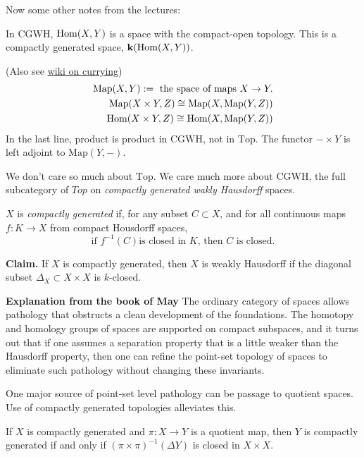 Now some other notes from the lectures:

In $\text{CGWH}$, $\mathop{\mathrm{Hom}}\nolimits(X,Y)$ is a space with
the compact-open topology.
This is a compactly generated space,
$\mathbf{k}(\mathop{\mathrm{Hom}}\nolimits(X,Y))$.

(Also see
\href{https://en.wikipedia.org/wiki/%
Currying#Function_spaces}{wiki
on currying})
$$
\begin{aligned}
\text{Map}(X,Y):=\text{ the space of maps
}X\to Y.\\
\text{Map}(X\times
Y,Z)\cong\text{Map}(X,\text{Map}(Y,Z))\\
\mathop{\mathrm{Hom}}\nolimits(X\times Y,Z)\cong
\mathop{\mathrm{Hom}}\nolimits(X,\text{Map}(Y,Z))
\end{aligned}
$$
In the last line, product is product in
$\text{CGWH}$, not in $\text{Top}$.
The functor $-\times Y$ is left adjoint to
$\text{Map}(Y,-)$.

We don't care so much about $\text{Top}$. We
care much more about $\text{CGWH}$,
the full subcategory of $\mathit{Top}$ on
 {\it compactly generated wakly Hausdorff}
 spaces.

\begin{definition}
\label{definition-is-this-right}
$X$ is {\it compactly generated} if, for any
subset $C\subset X$, and for all continuous
maps $f:K\to X$ from compact Housdorff
spaces, $$\text{if } f^{-1}(C) \text{is
closed in }K\text{, then } C\text{ is
closed}.$$
\end{definition}
{\bf Claim.}
If $X$ is compactly generated, then $X$ is
weakly Hausdorff if the diagonal subset
$\Delta_X\subset X\times X$ is $k$-closed.


{\bf Explanation from the book of May}
The ordinary category of spaces
allows pathology that obstructs a clean
development of the foundations.
The homotopy and homology groups of spaces
are supported on compact subspaces, and
it turns out that if one assumes a separation
property
that is a little weaker
than the Hausdorff property,
then one can refine the point-set topology of
spaces to eliminate
such pathology without changing these
invariants.

One major source of point-set level pathology
can be passage to quotient spaces.
Use of compactly generated topologies
alleviates this.

\begin{proposition}
\label{proposition-if-x-compa-gener-x-y}
If $X$ is compactly generated and $\pi:X\to
Y$ is a quotient map,
then $Y$ is compactly generated if and only
if $(\pi\times \pi)^{-1}(\Delta Y)$
 is closed in $X\times X$.
\end{proposition}

